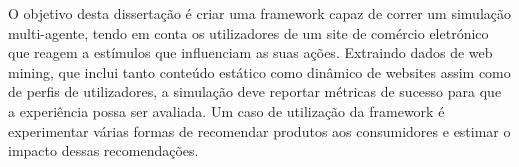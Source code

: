 O objetivo desta dissertação é criar uma framework capaz de correr um simulação 
multi-agente, tendo em conta os utilizadores de um site de comércio eletrónico 
que reagem a estímulos que influenciam as suas ações. Extraindo dados de web 
mining, que inclui tanto conteúdo estático como dinâmico de websites assim como 
de perfis de utilizadores, a simulação deve reportar métricas de sucesso para 
que a experiência possa ser avaliada. Um caso de utilização da framework é 
experimentar várias formas de recomendar produtos aos consumidores e estimar o 
impacto dessas recomendações.
